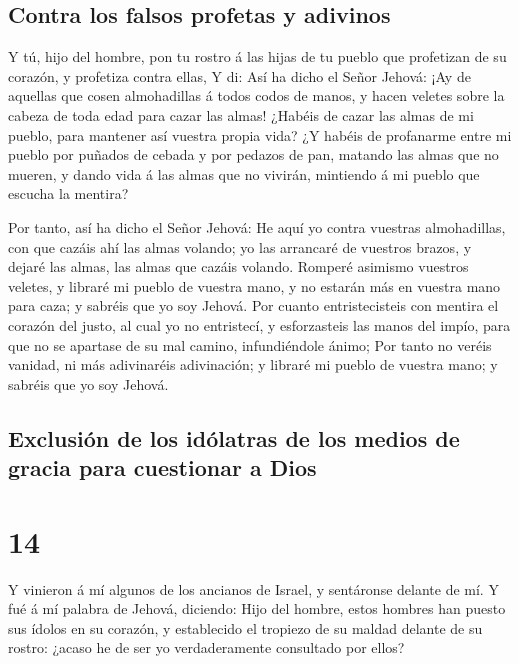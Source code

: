 \hypertarget{contra-los-falsos-profetas-y-adivinos}{%
\subsection{Contra los falsos profetas y
adivinos}\label{contra-los-falsos-profetas-y-adivinos}}

 Y tú, hijo del hombre, pon tu rostro á las hijas de tu
pueblo que profetizan de su corazón, y profetiza contra ellas,
 Y di: Así ha dicho el Señor Jehová: ¡Ay de aquellas que
cosen almohadillas á todos codos de manos, y hacen veletes sobre la
cabeza de toda edad para cazar las almas! ¿Habéis de cazar las almas de
mi pueblo, para mantener así vuestra propia vida?  ¿Y
habéis de profanarme entre mi pueblo por puñados de cebada y por pedazos
de pan, matando las almas que no mueren, y dando vida á las almas que no
vivirán, mintiendo á mi pueblo que escucha la mentira?

 Por tanto, así ha dicho el Señor Jehová: He aquí yo
contra vuestras almohadillas, con que cazáis ahí las almas volando; yo
las arrancaré de vuestros brazos, y dejaré las almas, las almas que
cazáis volando.  Romperé asimismo vuestros veletes, y
libraré mi pueblo de vuestra mano, y no estarán más en vuestra mano para
caza; y sabréis que yo soy Jehová.  Por cuanto
entristecisteis con mentira el corazón del justo, al cual yo no
entristecí, y esforzasteis las manos del impío, para que no se apartase
de su mal camino, infundiéndole ánimo;  Por tanto no
veréis vanidad, ni más adivinaréis adivinación; y libraré mi pueblo de
vuestra mano; y sabréis que yo soy Jehová.

\hypertarget{exclusiuxf3n-de-los-iduxf3latras-de-los-medios-de-gracia-para-cuestionar-a-dios}{%
\subsection{Exclusión de los idólatras de los medios de gracia para
cuestionar a
Dios}\label{exclusiuxf3n-de-los-iduxf3latras-de-los-medios-de-gracia-para-cuestionar-a-dios}}

\hypertarget{section-26-14}{%
\section{14}\label{section-26-14}}

 Y vinieron á mí algunos de los ancianos de Israel, y
sentáronse delante de mí.  Y fué á mí palabra de Jehová,
diciendo:  Hijo del hombre, estos hombres han puesto sus
ídolos en su corazón, y establecido el tropiezo de su maldad delante de
su rostro: ¿acaso he de ser yo verdaderamente consultado por ellos?

